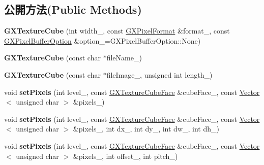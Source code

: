 \subsection*{公開方法(Public Methods)}
\begin{DoxyCompactItemize}
\item 
{\bfseries G\+X\+Texture\+Cube} (int width\+\_\+, const \hyperlink{class_magnum_1_1_g_x_pixel_format}{G\+X\+Pixel\+Format} \&format\+\_\+, const \hyperlink{class_magnum_1_1_g_x_pixel_buffer_option}{G\+X\+Pixel\+Buffer\+Option} \&option\+\_\+=G\+X\+Pixel\+Buffer\+Option\+::\+None)\hypertarget{class_magnum_1_1_g_x_texture_cube_a0feba5798fd9f23e268a6af81542895c}{}\label{class_magnum_1_1_g_x_texture_cube_a0feba5798fd9f23e268a6af81542895c}

\item 
{\bfseries G\+X\+Texture\+Cube} (const char $\ast$file\+Name\+\_\+)\hypertarget{class_magnum_1_1_g_x_texture_cube_aacfb52320d982ae93f13781db7445ec9}{}\label{class_magnum_1_1_g_x_texture_cube_aacfb52320d982ae93f13781db7445ec9}

\item 
{\bfseries G\+X\+Texture\+Cube} (const char $\ast$file\+Image\+\_\+, unsigned int length\+\_\+)\hypertarget{class_magnum_1_1_g_x_texture_cube_a5f7a0834c310063baecdfba2c28ee3d6}{}\label{class_magnum_1_1_g_x_texture_cube_a5f7a0834c310063baecdfba2c28ee3d6}

\item 
void {\bfseries set\+Pixels} (int level\+\_\+, const \hyperlink{class_magnum_1_1_g_x_texture_cube_face}{G\+X\+Texture\+Cube\+Face} \&cube\+Face\+\_\+, const \hyperlink{class_magnum_1_1_vector}{Vector}$<$ unsigned char $>$ \&pixels\+\_\+)\hypertarget{class_magnum_1_1_g_x_texture_cube_af2142d3c038e773d1b43127a3bd1fb06}{}\label{class_magnum_1_1_g_x_texture_cube_af2142d3c038e773d1b43127a3bd1fb06}

\item 
void {\bfseries set\+Pixels} (int level\+\_\+, const \hyperlink{class_magnum_1_1_g_x_texture_cube_face}{G\+X\+Texture\+Cube\+Face} \&cube\+Face\+\_\+, const \hyperlink{class_magnum_1_1_vector}{Vector}$<$ unsigned char $>$ \&pixels\+\_\+, int dx\+\_\+, int dy\+\_\+, int dw\+\_\+, int dh\+\_\+)\hypertarget{class_magnum_1_1_g_x_texture_cube_a1fde40d0364534b5ad661a58722c92c2}{}\label{class_magnum_1_1_g_x_texture_cube_a1fde40d0364534b5ad661a58722c92c2}

\item 
void {\bfseries set\+Pixels} (int level\+\_\+, const \hyperlink{class_magnum_1_1_g_x_texture_cube_face}{G\+X\+Texture\+Cube\+Face} \&cube\+Face\+\_\+, const \hyperlink{class_magnum_1_1_vector}{Vector}$<$ unsigned char $>$ \&pixels\+\_\+, int offset\+\_\+, int pitch\+\_\+)\hypertarget{class_magnum_1_1_g_x_texture_cube_a80e80831ac48023f7e2314e30e0a8cb1}{}\label{class_magnum_1_1_g_x_texture_cube_a80e80831ac48023f7e2314e30e0a8cb1}


\end{DoxyCompactItemize}
